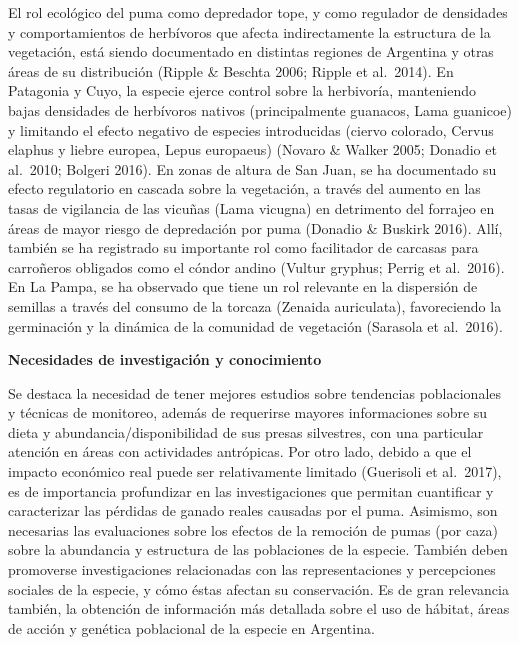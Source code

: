 \documentclass[
  x11names]{article}
\begin{document}
El rol ecológico del puma como depredador tope, y como regulador de
densidades y comportamientos de herbívoros que afecta indirectamente la
estructura de la vegetación, está siendo documentado en distintas
regiones de Argentina y otras áreas de su distribución (Ripple \&
Beschta 2006; Ripple et al.~2014). En Patagonia y Cuyo, la especie
ejerce control sobre la herbivoría, manteniendo bajas densidades de
herbívoros nativos (principalmente guanacos, Lama guanicoe) y limitando
el efecto negativo de especies introducidas (ciervo colorado, Cervus
elaphus y liebre europea, Lepus europaeus) (Novaro \& Walker 2005;
Donadio et al.~2010; Bolgeri 2016). En zonas de altura de San Juan, se
ha documentado su efecto regulatorio en cascada sobre la vegetación, a
través del aumento en las tasas de vigilancia de las vicuñas (Lama
vicugna) en detrimento del forrajeo en áreas de mayor riesgo de
depredación por puma (Donadio \& Buskirk 2016). Allí, también se ha
registrado su importante rol como facilitador de carcasas para
carroñeros obligados como el cóndor andino (Vultur gryphus; Perrig et
al.~2016). En La Pampa, se ha observado que tiene un rol relevante en la
dispersión de semillas a través del consumo de la torcaza (Zenaida
auriculata), favoreciendo la germinación y la dinámica de la comunidad
de vegetación (Sarasola et al.~2016).

\textbf{Necesidades de investigación y conocimiento}

Se destaca la necesidad de tener mejores estudios sobre tendencias
poblacionales y técnicas de monitoreo, además de requerirse mayores
informaciones sobre su dieta y abundancia/disponibilidad de sus presas
silvestres, con una particular atención en áreas con actividades
antrópicas. Por otro lado, debido a que el impacto económico real puede
ser relativamente limitado (Guerisoli et al.~2017), es de importancia
profundizar en las investigaciones que permitan cuantificar y
caracterizar las pérdidas de ganado reales causadas por el puma.
Asimismo, son necesarias las evaluaciones sobre los efectos de la
remoción de pumas (por caza) sobre la abundancia y estructura de las
poblaciones de la especie. También deben promoverse investigaciones
relacionadas con las representaciones y percepciones sociales de la
especie, y cómo éstas afectan su conservación. Es de gran relevancia
también, la obtención de información más detallada sobre el uso de
hábitat, áreas de acción y genética poblacional de la especie en
Argentina.

\end{document}
